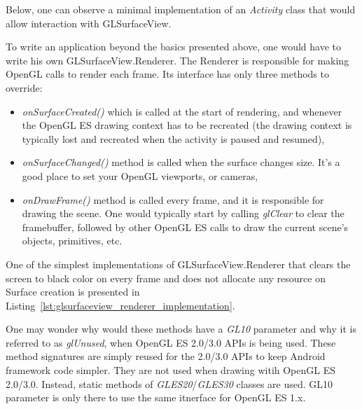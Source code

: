 Below, one can observe a minimal implementation of an \emph{Activity} class \cite{android_activity} that would allow interaction with GLSurfaceView.



To write an application beyond the basics presented above, one would have to write his own GLSurfaceView.Renderer. The Renderer is responsible for making OpenGL calls to render each frame.
Its interface has only three methods to override:

\begin{itemize}
\item \emph{onSurfaceCreated()} which is called at the start of rendering, and whenever the OpenGL ES drawing context has to be recreated (the drawing context is typically lost and recreated when the activity is paused and resumed),
\item \emph{onSurfaceChanged()} method is called when the surface changes size. It's a good place to set your OpenGL viewports, or cameras,
\item \emph{onDrawFrame()} method is called every frame, and it is responsible for drawing the scene. One would typically start by calling \emph{glClear} to clear the framebuffer, followed by other OpenGL ES calls to draw the current scene's objects, primitives, etc.
\end{itemize}

\pagebreak[3]
One of the simplest implementations of GLSurfaceView.Renderer that clears the screen to black color on every frame and does not allocate any resource on Surface creation is presented in Listing~\ref{lst:glsurfaceview_renderer_implementation}.


\begin{note}
{One may wonder why would these methods have a \emph{GL10} parameter and why it is referred to as \emph{glUnused}, when OpenGL ES 2.0/3.0 APIs is being used.
These method signatures are simply reused for the 2.0/3.0 APIs to keep Android framework code simpler.
They are not used when drawing witih OpenGL ES 2.0/3.0.
Instead, static methods of \emph{GLES20}/\emph{GLES30} classes are used.
GL10 parameter is only there to use the same itnerface for OpenGL ES 1.x.
}
\end{note}


